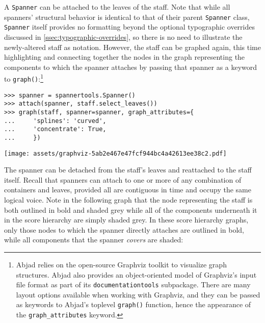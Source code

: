 \noindent A \texttt{Spanner} can be attached to the leaves of the staff. Note
that while all spanners' structural behavior is identical to that of their
parent \texttt{Spanner} class, \texttt{Spanner} itself provides no formatting
beyond the optional typographic overrides discussed in
\autoref{ssec:typographic-overrides}, so there is no need to illustrate the
newly-altered staff as notation. However, the staff can be graphed again, this
time highlighting and connecting together the nodes in the graph representing
the components to which the spanner attaches by passing that spanner as a
keyword to \texttt{graph()}:\footnote{Abjad relies on the open-source Graphviz
toolkit to visualize graph structures. Abjad also provides an object-oriented
model of Graphviz's input file format as part of its
\texttt{documentationtools} subpackage. There are many layout options available
when working with Graphviz, and they can be passed as keywords to Abjad's
toplevel \texttt{graph()} function, hence the appearance of the
\texttt{graph\_attributes} keyword.}

\begin{comment}
<abjad>
spanner = spannertools.Spanner()
attach(spanner, staff.select_leaves())
graph(staff, spanner=spanner, graph_attributes={
    'splines': 'curved',
    'concentrate': True,
    })
</abjad>
\end{comment}

\begin{abjadbookoutput}
\begin{singlespacing}
\vspace{-0.5\baselineskip}
\begin{lstlisting}
>>> spanner = spannertools.Spanner()
>>> attach(spanner, staff.select_leaves())
>>> graph(staff, spanner=spanner, graph_attributes={
...     'splines': 'curved',
...     'concentrate': True,
...     })
\end{lstlisting}
\noindent\texttt{[image: assets/graphviz-5ab2e467e47fcf944bc4a42613ee38c2.pdf]}
\end{singlespacing}
\end{abjadbookoutput}

\noindent The spanner can be detached from the staff's leaves and reattached to
the staff itself. Recall that spanners can attach to one or more of any
combination of containers and leaves, provided all are contiguous in time and
occupy the same logical voice. Note in the following graph that the node
representing the staff is both outlined in bold and shaded grey while all of
the components underneath it in the score hierarchy are simply shaded grey. In
these score hierarchy graphs, only those nodes to which the spanner directly
attaches are outlined in bold, while all components that the spanner
\emph{covers} are shaded:

